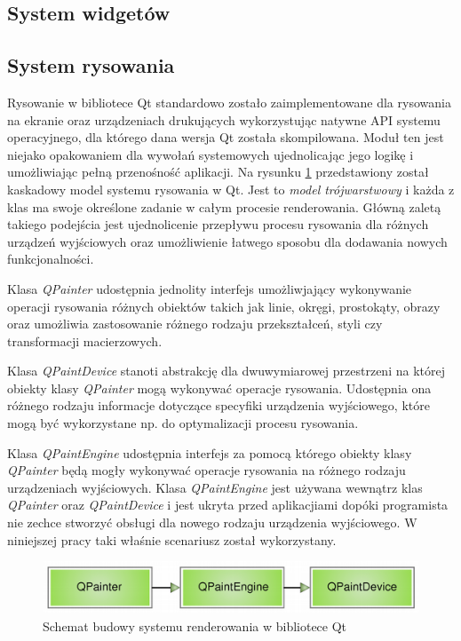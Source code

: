 \documentclass[polish]{inz}
\begin{document}
\subsection{System widgetów}


\subsection{System rysowania}
Rysowanie w bibliotece Qt standardowo zostało zaimplementowane dla rysowania na ekranie oraz urządzeniach drukujących wykorzystując natywne API systemu operacyjnego, dla którego dana wersja Qt została skompilowana. Moduł ten jest niejako opakowaniem dla wywołań systemowych ujednolicając jego logikę i umożliwiając pełną przenośność aplikacji. Na rysunku \ref{paintsystem-core} przedstawiony został kaskadowy model systemu rysowania w Qt. Jest to \emph{model trójwarstwowy} i każda z klas ma swoje określone zadanie w całym procesie renderowania. Główną zaletą takiego podejścia jest ujednolicenie przepływu procesu rysowania dla różnych urządzeń wyjściowych oraz umożliwienie łatwego sposobu dla dodawania nowych funkcjonalności.

Klasa \emph{QPainter} udostępnia jednolity interfejs umożliwjający wykonywanie operacji rysowania różnych obiektów takich jak linie, okręgi, prostokąty, obrazy oraz umożliwia zastosowanie różnego rodzaju przekształceń, styli czy transformacji macierzowych. 

Klasa \emph{QPaintDevice} stanoti abstrakcję dla dwuwymiarowej przestrzeni na której obiekty klasy \emph{QPainter} mogą wykonywać operacje rysowania. Udostępnia ona różnego rodzaju informacje dotyczące specyfiki urządzenia wyjściowego, które mogą być wykorzystane np. do optymalizacji procesu rysowania. 

Klasa \emph{QPaintEngine} udostępnia interfejs za pomocą którego obiekty klasy \emph{QPainter} będą mogły wykonywać operacje rysowania na różnego rodzaju urządzeniach wyjściowych. Klasa \emph{QPaintEngine} jest używana wewnątrz klas \emph{QPainter} oraz \emph{QPaintDevice} i jest ukryta przed aplikacjiami dopóki programista nie zechce stworzyć obsługi dla nowego rodzaju urządzenia wyjściowego. W niniejszej pracy taki właśnie scenariusz został wykorzystany.
 
\begin{figure}
  \centering
  \includegraphics[width=\textwidth,height=!]{img/paintsystem-core.png}
  \caption{Schemat budowy systemu renderowania w bibliotece Qt}
  \label{paintsystem-core}
\end{figure}
\end{document}
